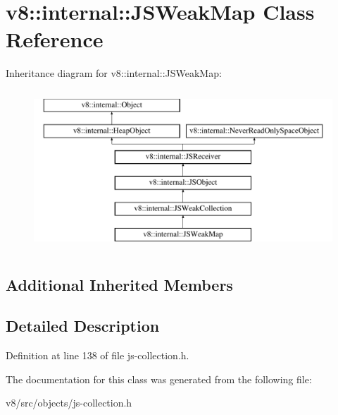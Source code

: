 \hypertarget{classv8_1_1internal_1_1JSWeakMap}{}\section{v8\+:\+:internal\+:\+:J\+S\+Weak\+Map Class Reference}
\label{classv8_1_1internal_1_1JSWeakMap}
Inheritance diagram for v8\+:\+:internal\+:\+:J\+S\+Weak\+Map\+:\begin{figure}[H]
\begin{center}
\leavevmode
\includegraphics[height=6.000000cm]{classv8_1_1internal_1_1JSWeakMap}
\end{center}
\end{figure}
\subsection*{Additional Inherited Members}


\subsection{Detailed Description}


Definition at line 138 of file js-\/collection.\+h.



The documentation for this class was generated from the following file\+:\begin{DoxyCompactItemize}
\item 
v8/src/objects/js-\/collection.\+h\end{DoxyCompactItemize}
